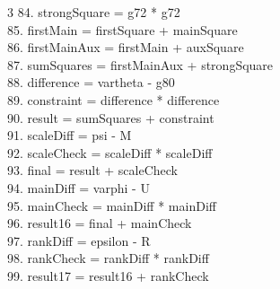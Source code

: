 \documentclass[10pt]{article}
\begin{document}
\begin{multicols}{3}
84. strongSquare = g72 * g72\\
85. firstMain = firstSquare + mainSquare\\
86. firstMainAux = firstMain + auxSquare\\
87. sumSquares = firstMainAux + strongSquare\\
88. difference = vartheta - g80\\
89. constraint = difference * difference\\
90. result = sumSquares + constraint\\
91. scaleDiff = psi - M\\
92. scaleCheck = scaleDiff * scaleDiff\\
93. final = result + scaleCheck\\
94. mainDiff = varphi - U\\
95. mainCheck = mainDiff * mainDiff\\
96. result16 = final + mainCheck\\
97. rankDiff = epsilon - R\\
98. rankCheck = rankDiff * rankDiff\\
99. result17 = result16 + rankCheck\\
\end{multicols}
\end{document}

